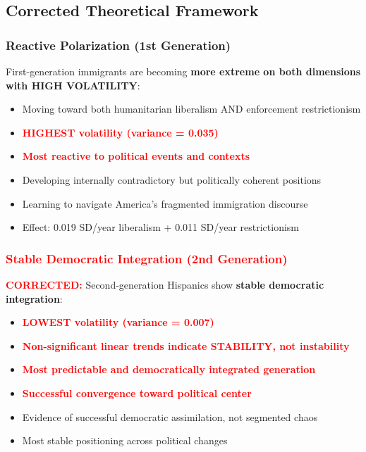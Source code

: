 \documentclass[11pt,letterpaper]{article}
\begin{document}
\subsection{Corrected Theoretical Framework}

\subsubsection{Reactive Polarization (1st Generation)}
First-generation immigrants are becoming \textbf{more extreme on both dimensions with HIGH VOLATILITY}:
\begin{itemize}
    \item Moving toward both humanitarian liberalism AND enforcement restrictionism
    \item \textcolor{red}{\textbf{HIGHEST volatility (variance = 0.035)}}
    \item \textcolor{red}{\textbf{Most reactive to political events and contexts}}
    \item Developing internally contradictory but politically coherent positions
    \item Learning to navigate America's fragmented immigration discourse
    \item Effect: 0.019 SD/year liberalism + 0.011 SD/year restrictionism
\end{itemize}

\subsubsection{\textcolor{red}{Stable Democratic Integration (2nd Generation)}}
\textcolor{red}{\textbf{CORRECTED:}} Second-generation Hispanics show \textbf{stable democratic integration}:
\begin{itemize}
    \item \textcolor{red}{\textbf{LOWEST volatility (variance = 0.007)}}
    \item \textcolor{red}{\textbf{Non-significant linear trends indicate STABILITY, not instability}}
    \item \textcolor{red}{\textbf{Most predictable and democratically integrated generation}}
    \item \textcolor{red}{\textbf{Successful convergence toward political center}}
    \item Evidence of successful democratic assimilation, not segmented chaos
    \item Most stable positioning across political changes
\end{itemize}
\end{document}
